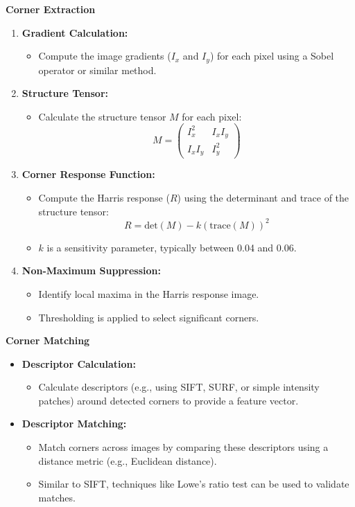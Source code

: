 \documentclass{article}
\begin{document}
\textbf{Corner Extraction}
\begin{enumerate}
    \item \textbf{Gradient Calculation:}
    \begin{itemize}
        \item Compute the image gradients ($I_x$ and $I_y$) for each pixel using a Sobel operator or similar method.
    \end{itemize}
    
    \item \textbf{Structure Tensor:}
    \begin{itemize}
        \item Calculate the structure tensor $M$ for each pixel:
        \[
        M = \begin{pmatrix}
        I_x^2 & I_x I_y \\
        I_x I_y & I_y^2
        \end{pmatrix}
        \]
    \end{itemize}
    
    \item \textbf{Corner Response Function:}
    \begin{itemize}
        \item Compute the Harris response ($R$) using the determinant and trace of the structure tensor:
        \[
        R = \text{det}(M) - k (\text{trace}(M))^2
        \]
        \item $k$ is a sensitivity parameter, typically between 0.04 and 0.06.
    \end{itemize}
    
    \item \textbf{Non-Maximum Suppression:}
    \begin{itemize}
        \item Identify local maxima in the Harris response image.
        \item Thresholding is applied to select significant corners.
    \end{itemize}
\end{enumerate}

\textbf{Corner Matching}
\begin{itemize}
    \item \textbf{Descriptor Calculation:}
    \begin{itemize}
        \item Calculate descriptors (e.g., using SIFT, SURF, or simple intensity patches) around detected corners to provide a feature vector.
    \end{itemize}
    
    \item \textbf{Descriptor Matching:}
    \begin{itemize}
        \item Match corners across images by comparing these descriptors using a distance metric (e.g., Euclidean distance).
        \item Similar to SIFT, techniques like Lowe’s ratio test can be used to validate matches.
    \end{itemize}
\end{itemize}
\end{document}
